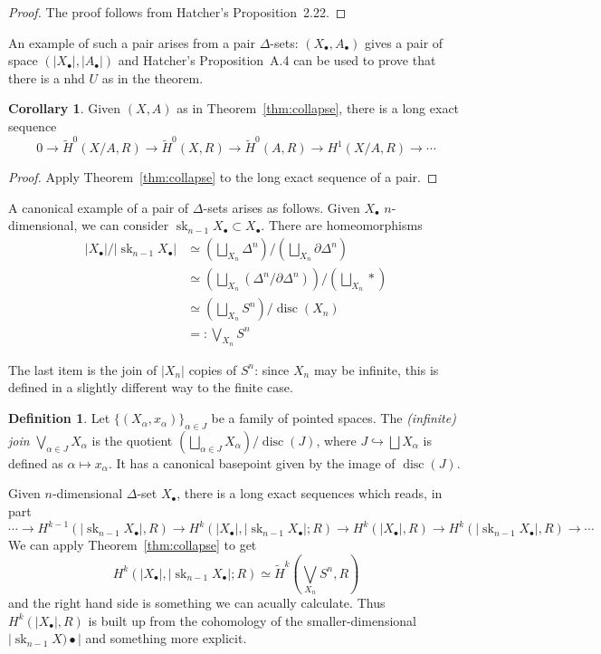 \documentclass{tufte-handout}
\def\into {\hookrightarrow}
\DeclareMathOperator{\disc}{disc}
\DeclareMathOperator{\sk}{sk}
\theoremstyle{definition}
\newtheorem{definition}{Definition}
\newtheorem{corollary}{Corollary}
\begin{document}
\begin{proof}
The proof follows from Hatcher's Proposition~2.22.
\end{proof}

An example of such a pair arises from a pair $\Delta$-sets: $(X_\bullet,A_\bullet)$ gives a pair of space $(|X_\bullet|,|A_\bullet|)$ and Hatcher's Proposition~A.4 can be used to prove that there is a nhd $U$ as in the theorem.

\begin{corollary}
Given $(X,A)$ as in Theorem~\ref{thm:collapse}, there is a long exact sequence
\[
0\to \widetilde{H}^0(X/A,R) \to \widetilde{H}^0(X,R) \to \widetilde{H}^0(A,R) \to H^1(X/A,R) \to \cdots
\]
\end{corollary}

\begin{proof}
Apply Theorem~\ref{thm:collapse} to the long exact sequence of a pair.
\end{proof}

A canonical example of a pair of $\Delta$-sets arises as follows. Given $X_\bullet$ $n$-dimensional, we can consider $\sk_{n-1}X_\bullet \subset X_\bullet$. There are homeomorphisms
\begin{align*}
|X_\bullet|/|\sk_{n-1}X_\bullet| 
& \simeq \left(\bigsqcup_{X_n} \Delta^n\right)\big/\left(\bigsqcup_{X_n}\partial\Delta^n\right)\\
& \simeq \left(\bigsqcup_{X_n}(\Delta^n/\partial\Delta^n)\right)\big/\left(\bigsqcup_{X_n}\ast\right)\\
& \simeq \left(\bigsqcup_{X_n} S^n\right)/\disc(X_n)\\
& =: \bigvee_{X_n} S^n
\end{align*}

The last item is the join of $|X_n|$ copies of $S^n$: since $X_n$ may be infinite, this is defined in a slightly different way to the finite case.

\begin{definition}
Let $\{(X_\alpha,x_\alpha)\}_{\alpha\in J}$ be a family of pointed spaces. The \emph{(infinite) join} $\bigvee_{\alpha\in J} X_\alpha$ is the quotient $\left(\bigsqcup_{\alpha\in J} X_\alpha\right)/\disc(J)$, where $J\into \bigsqcup X_\alpha$ is defined as $\alpha \mapsto x_\alpha$. It has a canonical basepoint given by the image of $\disc(J)$.
\end{definition}


Given $n$-dimensional $\Delta$-set $X_\bullet$, there is a long exact sequences which reads, in part
\[
\cdots \to H^{k-1}(|\sk_{n-1}X_\bullet|,R) \to H^k(|X_\bullet|,|\sk_{n-1}X_\bullet|;R) \to H^k(|X_\bullet|,R) \to H^k(|\sk_{n-1}X_\bullet|,R) \to \cdots 
\]
We can apply Theorem~\ref{thm:collapse} to get 
\[
	H^k(|X_\bullet|,|\sk_{n-1}X_\bullet|;R) \simeq \widetilde{H}^k(\bigvee_{X_n}S^n,R)
\]
and the right hand side is something we can acually calculate. Thus $H^k(|X_\bullet|,R)$ is built up from the cohomology of the smaller-dimensional $|\sk_{n-1}X)\bullet|$ and something more explicit.
\end{document}
